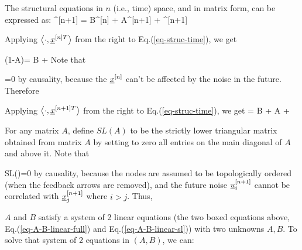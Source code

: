 The structural equations in $n$ (i.e., time) space,
and in matrix form, can be expressed as:
\beq
\rvx^{[n+1]} = B\rvx^{[n]} + A\rvx^{[n+1]}
+ \rvu^{[n+1]}
\label{eq-struc-time}
\eeq

Applying $\av{\cdot, \rvx^{[n]T} }$
from the right to Eq.(\ref{eq-struc-time}), we get

\beq 
(1-A)=
B 
+ 
\eeq
Note that

\beq
{}=0
\eeq
by causality, 
because the $\rvx^{[n]}$
can't be affected by the noise in the future.
Therefore

\beq
{}
\label{eq-A-B-linear-full}
\eeq


Applying $\av{\cdot, \rvx^{[n+1]T} }$
from the right to Eq.(\ref{eq-struc-time}), we get
\beq
{}
= B
 + A
+ 
\eeq

For any matrix $A$,
define $SL(A)$ 
to be the strictly lower triangular
matrix obtained from matrix $A$ by
setting to zero all entries 
on the main diagonal of $A$ and above it.
Note that

\beq 
SL()=0
\eeq
by causality,
because the nodes are assumed to be topologically ordered (when the feedback
arrows are removed),
and the future noise $\rvu^{[n+1]}_i$
cannot be
correlated with $\rvx^{[n+1]}_j$
where  $i>j$.
Thus,

\beq
{}
\label{eq-A-B-linear-sl}
\eeq

$A$ and $B$ satisfy a system of 2 linear equations (the two boxed
equations above, Eq.(\ref{eq-A-B-linear-full})
and Eq.(\ref{eq-A-B-linear-sl})) with two unknowns $A,B$.
To solve that system of 2 equations in $(A, B)$, we can:

